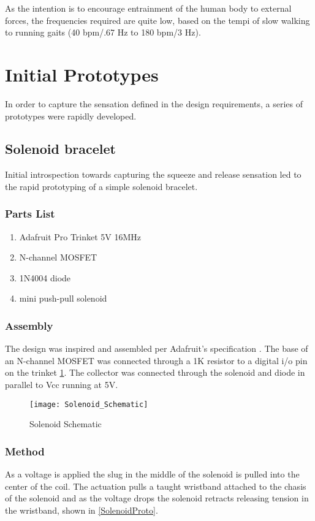 As the intention is to encourage entrainment of the human body to external forces, the frequencies
required are quite low, based on the tempi of slow walking to running gaits
(40 bpm/.67 Hz to 180 bpm/3 Hz).

\cite{Neely}

\section{Initial Prototypes}
In order to capture the sensation defined in the design requirements, a series of prototypes were rapidly developed.

\subsection{Solenoid bracelet}
Initial introspection towards capturing the squeeze and release sensation led to the rapid prototyping of a simple solenoid bracelet. 
\subsubsection{Parts List}
\begin{enumerate}
    \item Adafruit Pro Trinket 5V 16MHz
    \item N-channel MOSFET
    \item 1N4004 diode
    \item mini push-pull solenoid
\end{enumerate}
\subsubsection{Assembly}
The design was inspired and assembled per Adafruit's specification \cite{Solenoid}. 
The base of an N-channel MOSFET was connected through a 1K resistor to a digital i/o pin on the trinket \ref{SolenoidSchematic}. The collector was connected through the solenoid and diode in parallel to Vcc running at 5V.
\begin{figure}[H]
    \texttt{[image: Solenoid\_Schematic]}
    \caption{Solenoid Schematic}
    \label{SolenoidSchematic}
\end{figure}
\subsubsection{Method}
    As a voltage is applied the slug in the middle of the solenoid is pulled into the center of the coil. The actuation pulls a taught wristband attached to the chasis of the solenoid and as the voltage drops the solenoid retracts releasing tension in the wristband, shown in \ref{SolenoidProto}.
    
